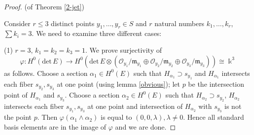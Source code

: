 \documentclass[a4paper]{amsart}
\theoremstyle{plain}
\theoremstyle{definition}
\begin{document}
\begin{proof}{(of Theorem \ref{2-jet})}

    Consider $r\le3$ distinct points $y_1,\dots,y_r\in S$ and $r$ natural numbers $k_1,\dots,k_r$, $\sum k_i=3$.
    We need to examine three different cases:

    (1) $r=3$, $k_1=k_2=k_3=1$. We prove surjectivity of
    \[
    \varphi \colon H^0(\mathrm{det}\, E) \to H^0(\mathrm{det} \,E\otimes (\mathcal O_{y_1}/ \mathfrak m_{y_1}\oplus \mathcal O_{y_2}/ \mathfrak m_{y_2} \oplus \mathcal O_{y_3}/ \mathfrak m_{y_3})) \cong \Bbbk^3
    \]
    as follows. Choose a section $\alpha_1 \in H^0(E)$ such that $H_{\alpha_1} \supset s_{y_1}$ and $H_{\alpha_1}$ intersects each fiber $s_{y_2}, s_{y_3}$ at one point (using lemma \ref{obvious}); let $p$ be the intersection point of $H_{\alpha_1}$ and $s_{y_3}$.
    Choose a section $\alpha_2 \in H^0(E)$ such that $H_{\alpha_2} \supset s_{y_2}$, $H_{\alpha_2}$ intersects each fiber $s_{y_1}, s_{y_3}$ at one point and intersection of $H_{\alpha_2}$ with $s_{y_3}$ is not the point $p$.
    Then $\varphi (\alpha_1 \wedge \alpha_2)$ is equal to $(0, 0, \lambda), \lambda \neq 0$. Hence all standard basis elements are in the image of $\varphi$ and we are done.


\end{proof}
\end{document}
